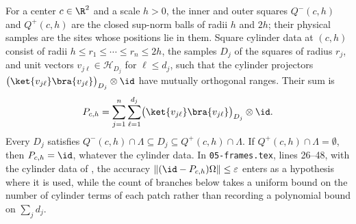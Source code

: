 \begin{definition}
    \label{def:peps_frame_square_patch}
    \leanok
    For a center $c\in\R^2$ and a scale $h>0$, the inner and outer squares
    $Q^-(c,h)$ and $Q^+(c,h)$ are the closed sup-norm balls of radii $h$ and
    $2h$; their physical samples are the sites whose positions lie in them.
    Square cylinder data at $(c,h)$ consist of radii
    $h\le r_1\le\cdots\le r_n\le 2h$, the samples $D_j$ of the squares of
    radius $r_j$, and unit vectors $v_{j\ell}\in\mathcal H_{D_j}$ for
    $\ell\le d_j$, such that the cylinder projectors
    $\bigl(\ket{v_{j\ell}}\bra{v_{j\ell}}\bigr)_{D_j}\otimes\id$ have mutually
    orthogonal ranges. Their sum is
    \begin{align}
        P_{c,h}=\sum_{j=1}^{n}\sum_{\ell=1}^{d_j}
        \bigl(\ket{v_{j\ell}}\bra{v_{j\ell}}\bigr)_{D_j}\otimes\id .
        \label{eq:peps_frame_patch_proj}
    \end{align}
    Every $D_j$ satisfies $Q^-(c,h)\cap\Lambda\subseteq D_j\subseteq Q^+(c,h)\cap\Lambda$. If $Q^+(c,h)\cap\Lambda=\emptyset$, then $P_{c,h}=\id$, whatever the
    cylinder data. In \texttt{05-frames.tex}, lines 26--48,
    with the cylinder data of \cite[Proposition~4.1]{OpenAI2026PolynomialPEPS},
    the accuracy $\lVert(\id-P_{c,h})\Omega\rVert\le\varepsilon$ enters as
    a hypothesis where it is used, while the count of branches below takes a uniform bound on the number
    of cylinder terms of each patch rather than recording a polynomial bound on $\sum_jd_j$.
\end{definition}

